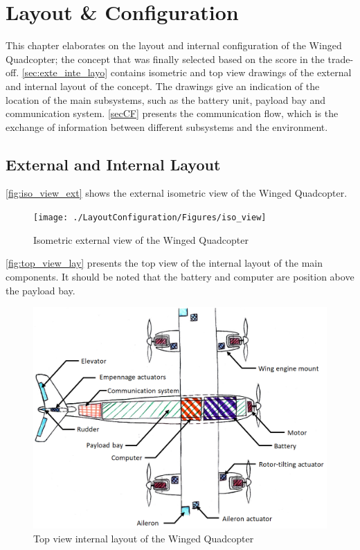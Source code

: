 \chapter{Layout \& Configuration}
\label{ch:layo_and_conf}

This chapter elaborates on the layout and internal configuration of the Winged Quadcopter; the concept that was finally selected based on the score in the trade-off. \autoref{sec:exte_inte_layo} contains isometric and top view drawings of the external and internal layout of the concept. The drawings give an indication of the location of the main subsystems, such as the battery unit, payload bay and communication system. \autoref{secCF} presents the communication flow, which is the exchange of information between different subsystems and the environment.

\section{External and Internal Layout}
\label{sec:exte_inte_layo}

\autoref{fig:iso_view_ext} shows the external isometric view of the Winged Quadcopter.

\begin{figure}[htb]
\texttt{[image: ./LayoutConfiguration/Figures/iso\_view]}
\caption{Isometric external view of the Winged Quadcopter}
\label{fig:iso_view_ext}
\end{figure}

\autoref{fig:top_view_lay} presents the top view of the internal layout of the main components. It should be noted that the battery and computer are position above the payload bay.

\begin{figure}[htb]
\includegraphics[width=\textwidth]{./LayoutConfiguration/Figures/top_view}
\caption{Top view internal layout of the Winged Quadcopter}
\label{fig:top_view_lay}
\end{figure}

